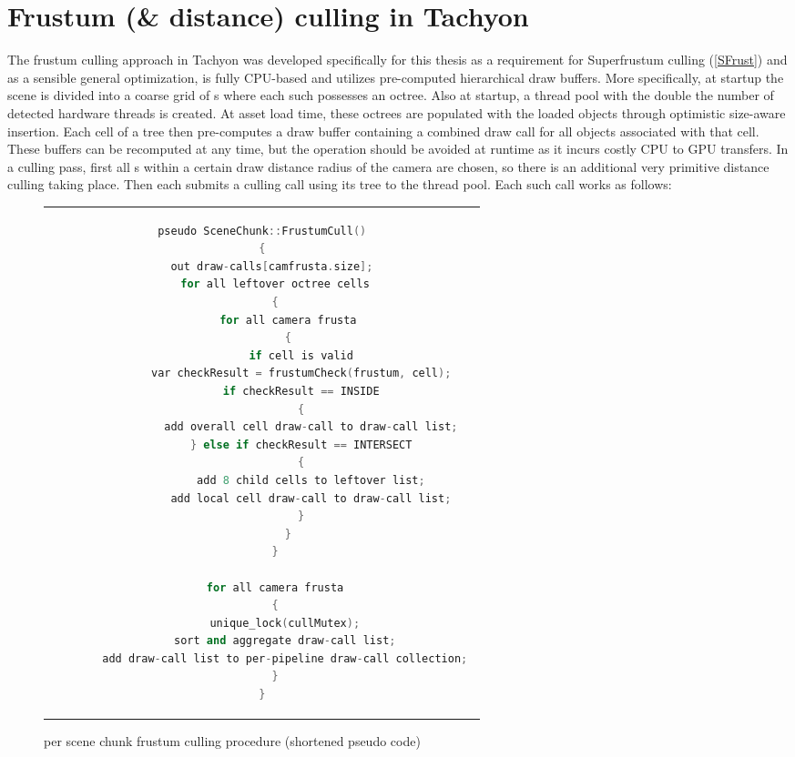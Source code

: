 \section{Frustum (\& distance) culling in \gls{Tachyon}}
The frustum culling approach in \gls{Tachyon} was developed specifically for this thesis as a requirement for Superfrustum culling (\autoref{SFrust}) and as a sensible general optimization, is fully CPU-based and utilizes pre-computed hierarchical draw buffers. More specifically, at startup the scene is divided into a coarse grid of s where each such  possesses an octree. Also at startup, a thread pool with the double the number of detected hardware threads is created. At asset load time, these octrees are populated with the loaded objects through optimistic size-aware insertion. Each cell of a tree then pre-computes a draw buffer containing a combined draw call for all objects associated with that cell. These buffers can be recomputed at any time, but the operation should be avoided at runtime as it incurs costly CPU to GPU transfers. 
In a culling pass, first all s within a certain draw distance radius of the camera are chosen, so there is an additional very primitive distance culling taking place. Then each  submits a culling call using its tree to the thread pool. Each such call works as follows: \\

\begin{figure}[h]
  \centering
  \begin{tabular}{c}
  \begin{lstlisting}[language=C++]
pseudo SceneChunk::FrustumCull()
{
	out	draw-calls[camfrusta.size]; 
	for all leftover octree cells
	{
		for all camera frusta
		{
			if cell is valid
			var checkResult = frustumCheck(frustum, cell);
			if checkResult == INSIDE
			{
				add overall cell draw-call to draw-call list; 
			} else if checkResult == INTERSECT
			{
				add 8 child cells to leftover list; 
				add local cell draw-call to draw-call list; 
			}
		}
	}
	
	for all camera frusta
	{
		unique_lock(cullMutex); 
		sort and aggregate draw-call list; 
		add draw-call list to per-pipeline draw-call collection; 
	}
}
  \end{lstlisting}
  \end{tabular}
  \caption[SceneChunk's FrustumCull()]{per scene chunk frustum culling procedure (shortened pseudo code)}\label{fig:lst_SceneChunk_FrustumCull}
\end{figure}

